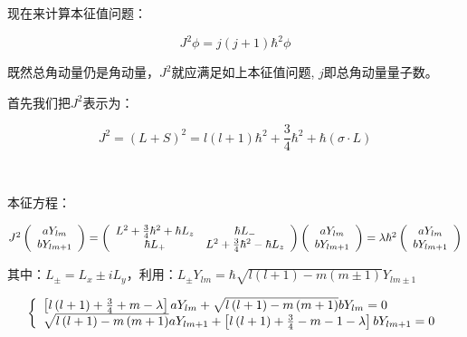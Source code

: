 现在来计算本征值问题：

\begin{equation*}
J^2 \phi = j(j+1)\hbar^2 \phi
\end{equation*}


既然总角动量仍是角动量，$J^2$就应满足如上本征值问题,
$j$即总角动量量子数。


首先我们把$J^2$表示为：


\begin{equation*}
J^2 = (L+S)^2 = l(l+1)\hbar^2 + \frac{3}{4}\hbar^2 + \hbar (\sigma
\cdot L)
\end{equation*}


~~~

本征方程：

$J^2 \left( {\begin{array}{*{20}c}
   {aY_{lm} }  \\
   {bY_{lm + 1} }  \\
\end{array}} \right) = \left( {\begin{array}{*{20}c}
   {L^2  + {\textstyle{3 \over 4}}\hbar ^2  + \hbar L_z } & {\hbar L_ -  }  \\
   {\hbar L_ +  } & {L^2  + {\textstyle{3 \over 4}}\hbar ^2  - \hbar L_z }  \\
\end{array}} \right)\left( {\begin{array}{*{20}c}
   {aY_{lm} }  \\
   {bY_{lm + 1} }  \\
\end{array}} \right) = \lambda \hbar ^2 \left( {\begin{array}{*{20}c}
   {aY_{lm} }  \\
   {bY_{lm + 1} }  \\
\end{array}} \right)$


其中：$L_ \pm   = L_x  \pm iL_y $，利用：$L_ \pm  Y_{lm}  = \hbar \sqrt {l(l + 1) - m(m \pm 1)} Y_{lm \pm 1} $


\begin{equation}\label{30-5}
\left\{ \begin{array}{l}
 \left[ {l\left( {l + 1} \right) + {\textstyle{3 \over 4}} + m - \lambda } \right]aY_{lm}  + \sqrt {l\left( {l + 1} \right) - m\left( {m + 1} \right)} bY_{lm}  = 0 \\
 \sqrt {l\left( {l + 1} \right) - m\left( {m + 1} \right)} aY_{lm + 1}  + \left[ {l\left( {l + 1} \right) + {\textstyle{3 \over 4}} - m - 1 - \lambda } \right]bY_{lm + 1}  = 0 \\
 \end{array} \right.
\end{equation}


